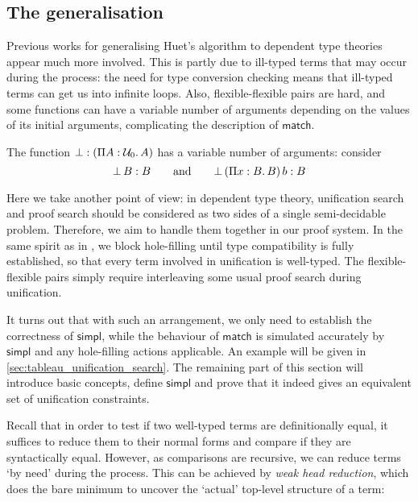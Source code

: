 \documentclass[twoside]{report}
\begin{document}
\subsection*{The generalisation}

Previous works for generalising Huet's algorithm to dependent type theories \cite{pym1990proofs,elliott1990extensions} appear much more involved. This is partly due to ill-typed terms that may occur during the process: the need for type conversion checking means that ill-typed terms can get us into infinite loops. Also, flexible-flexible pairs are hard, and some functions can have a variable number of arguments depending on the values of its initial arguments, complicating the description of $\mathsf{match}$.

\begin{example}
The function $\bot : (\Pi{A} : {\mathcal U_0}.\,{A})$ has a variable number of arguments: consider
$${\bot}\,{B} : B \qquad \text{and} \qquad {{\bot}\,{(}\Pi{x} : {B}.\,{B})}\,{b} : B$$
\end{example}

Here we take another point of view: in dependent type theory, unification search and proof search should be considered as two sides of a single semi-decidable problem. Therefore, we aim to handle them together in our proof system. In the same spirit as in \cite{norell2007towards}, we block hole-filling until type compatibility is fully established, so that every term involved in unification is well-typed. The flexible-flexible pairs simply require interleaving some usual proof search during unification.

It turns out that with such an arrangement, we only need to establish the correctness of $\mathsf{simpl}$, while the behaviour of $\mathsf{match}$ is simulated accurately by $\mathsf{simpl}$ and any hole-filling actions applicable. An example will be given in \cref{sec:tableau_unification_search}. The remaining part of this section will introduce basic concepts, define $\mathsf{simpl}$ and prove that it indeed gives an equivalent set of unification constraints.

Recall that in order to test if two well-typed terms are definitionally equal, it suffices to reduce them to their normal forms and compare if they are syntactically equal. However, as comparisons are recursive, we can reduce terms `by need' during the process. This can be achieved by \emph{weak head reduction}, which does the bare minimum to uncover the `actual' top-level structure of a term:
\end{document}
